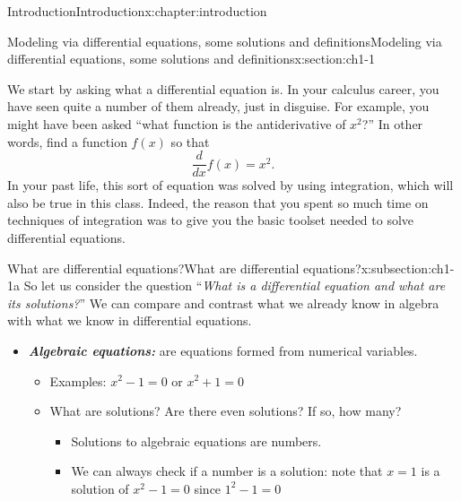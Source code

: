 \documentclass[oneside,10pt,]{book}
\newcommand{\alert}[1]{\textbf{\textit{#1}}}
\numberwithin{equation}{section}
\numberwithin{equation}{section}
\begin{document}
\begin{chapterptx}{Introduction}{}{Introduction}{}{}{x:chapter:introduction}
%
%
\typeout{************************************************}
\typeout{************************************************}
%
\begin{sectionptx}{Modeling via differential equations, some solutions and definitions}{}{Modeling via differential equations, some solutions and definitions}{}{}{x:section:ch1-1}
\begin{introduction}{}%
We start by asking what a differential equation is. In your calculus career, you have seen quite a number of them already, just in disguise. For example, you might have been asked ``what function is the antiderivative of \(x^2\)?'' In other words, find a function \(f(x)\) so that%
\begin{equation*}
\frac{d}{dx} f(x) = x^2.
\end{equation*}
In your past life, this sort of equation was solved by using integration, which will also be true in this class. Indeed, the reason that you spent so much time on techniques of integration was to give you the basic toolset needed to solve differential equations.%
\end{introduction}%
%
%
\typeout{************************************************}
\typeout{************************************************}
%
\begin{subsectionptx}{What are differential equations?}{}{What are differential equations?}{}{}{x:subsection:ch1-1a}
So let us consider the question ``\emph{What is a differential equation and what are its solutions?}'' We can compare and contrast what we already know in algebra with what we know in differential equations.%
%
\begin{itemize}[label=\textbullet]
\item{}\alert{Algebraic equations:} are equations formed from numerical variables.%
\begin{itemize}[label=$\circ$]
\item{}Examples: \(x^2 - 1 = 0\) or \(x^2 + 1 = 0\)%
\item{}What are solutions? Are there even solutions? If so, how many?%
\begin{itemize}[label=$\blacksquare$]
\item{}Solutions to algebraic equations are numbers.%
\item{}We can always check if a number is a solution: note that \(x = 1\) is a solution of \(x^2 - 1 = 0\) since \(1^2 - 1 = 0\)%

\end{itemize}
\end{itemize}
\end{itemize}
\end{subsectionptx}
\end{sectionptx}
\end{chapterptx}
\end{document}
